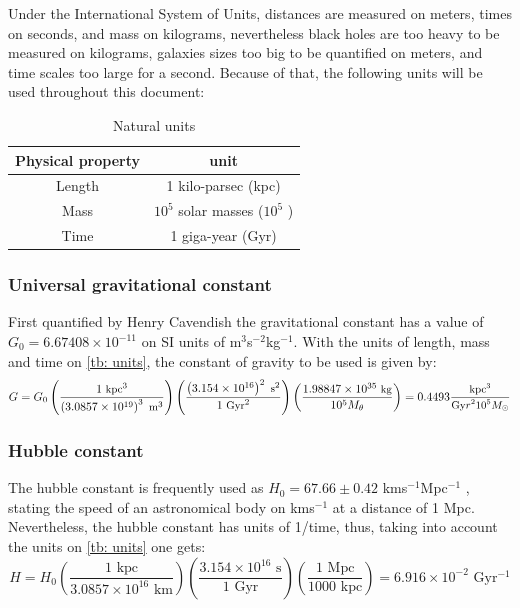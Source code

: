 		Under the International System of Units, distances are measured on meters, times on seconds, and mass on kilograms, nevertheless black holes are too heavy to be measured on kilograms, galaxies sizes too big to be quantified on meters, and time scales too large for a second. Because of that, the following units will be used throughout this document:
		\begin{table}[h]
			\centering
			\caption{Natural units}
			\label{tb: units}
			\begin{tabular}{c|c}
				\hline
				\textbf{Physical property} & \textbf{unit} \\
				\hline
				Length & 1 kilo-parsec (kpc) \\
				Mass & $10^5$ solar masses ($10^5$ \sm) \\
				Time & 1 giga-year (Gyr) \\
				\hline
			\end{tabular}
		\end{table}		
		
		\subsubsection{Universal gravitational constant}
			First quantified by Henry Cavendish the gravitational constant has a value of $G_0 = 6.67408\times10^{-11}$ on SI units of m$^3$s$^{-2}$kg$^{-1}$. With the units of length, mass and time on \autoref{tb: units}, the constant of gravity to be used is given by:
			\begin{equation}
				\small
				G = G_0 \left(\dfrac{1 \text{ kpc}^3}{\left(3.0857\times10^{19}\right)^3  \text{ m}^3}\right)\left(\dfrac{\left(3.154\times10^{16}\right)^2 \text{ s}^2}{1 \text{ Gyr}^2}\right)\left(\dfrac{1.98847\times10^{35} \text{ kg}}{10^5 M_\theta}\right) = 0.4493 \dfrac{\text{kpc$^3$}}{\text{Gy$r^210^5$$M_\odot$}}
			\end{equation}
			
		\subsubsection{Hubble constant}
		The hubble constant is frequently used as $H_0 = 67.66 \pm 0.42$ kms$^{-1}$Mpc$^{-1}$ \cite{aghanim2018planck}, stating the speed of an astronomical body on kms$^{-1}$ at a distance of 1 Mpc. Nevertheless, the hubble constant has units of 1/time, thus, taking into account the units on \autoref{tb: units} one gets:
		\begin{equation}
			H = H_0 \left(\dfrac{1 \text{ kpc}}{3.0857\times10^{16} \text{ km}}\right)\left(\dfrac{3.154\times10^{16} \text{ s}}{1 \text{ Gyr}}\right)\left(\dfrac{1 \text{ Mpc}}{1000 \text{ kpc}}\right) = 6.916\times10^{-2}\text{ Gyr$^{-1}$}
		\end{equation}
		
